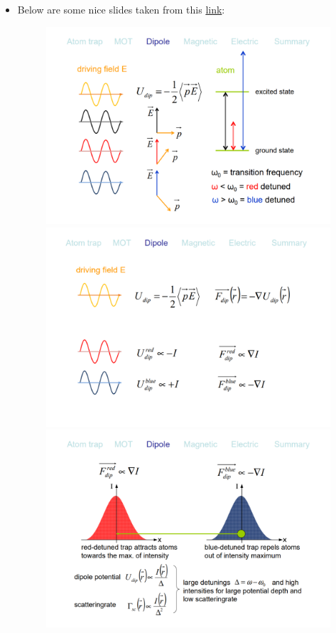 \documentclass{report}
\theoremstyle{definition}
\begin{document}
\begin{itemize}
\begin{itemize}
	
	\item Below are some nice slides taken from this \href{https://www.mpq.mpg.de/5020867/0515b_atom_traps.pdf}{link}:
	\begin{figure}[!htb]
		\centering
		\includegraphics[scale=0.3]{slide1}
		\includegraphics[scale=0.3]{slide2}
		\includegraphics[scale=0.3]{slide3}

\end{figure}
\end{itemize}
\end{itemize}
\end{document}
